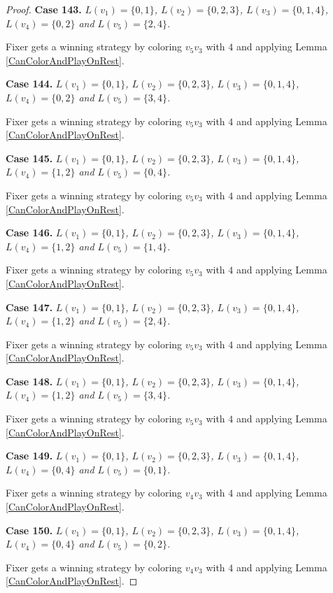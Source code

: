 \documentclass[12pt]{amsart}
\theoremstyle{plain}
\theoremstyle{definition}
\theoremstyle{remark}
\begin{document}
\begin{proof}
\noindent\textbf{Case 143.  }\textit{$L(v_1) = \{0, 1\}$, $L(v_2) = \{0, 2, 3\}$, $L(v_3) = \{0, 1, 4\}$, $L(v_4) = \{0, 2\}$ and $L(v_5) = \{2, 4\}$.}

Fixer gets a winning strategy by coloring $v_5v_3$ with $4$ and applying Lemma \ref{CanColorAndPlayOnRest}.

\noindent\textbf{Case 144.  }\textit{$L(v_1) = \{0, 1\}$, $L(v_2) = \{0, 2, 3\}$, $L(v_3) = \{0, 1, 4\}$, $L(v_4) = \{0, 2\}$ and $L(v_5) = \{3, 4\}$.}

Fixer gets a winning strategy by coloring $v_5v_3$ with $4$ and applying Lemma \ref{CanColorAndPlayOnRest}.

\noindent\textbf{Case 145.  }\textit{$L(v_1) = \{0, 1\}$, $L(v_2) = \{0, 2, 3\}$, $L(v_3) = \{0, 1, 4\}$, $L(v_4) = \{1, 2\}$ and $L(v_5) = \{0, 4\}$.}

Fixer gets a winning strategy by coloring $v_5v_3$ with $4$ and applying Lemma \ref{CanColorAndPlayOnRest}.

\noindent\textbf{Case 146.  }\textit{$L(v_1) = \{0, 1\}$, $L(v_2) = \{0, 2, 3\}$, $L(v_3) = \{0, 1, 4\}$, $L(v_4) = \{1, 2\}$ and $L(v_5) = \{1, 4\}$.}

Fixer gets a winning strategy by coloring $v_5v_3$ with $4$ and applying Lemma \ref{CanColorAndPlayOnRest}.

\noindent\textbf{Case 147.  }\textit{$L(v_1) = \{0, 1\}$, $L(v_2) = \{0, 2, 3\}$, $L(v_3) = \{0, 1, 4\}$, $L(v_4) = \{1, 2\}$ and $L(v_5) = \{2, 4\}$.}

Fixer gets a winning strategy by coloring $v_5v_3$ with $4$ and applying Lemma \ref{CanColorAndPlayOnRest}.

\noindent\textbf{Case 148.  }\textit{$L(v_1) = \{0, 1\}$, $L(v_2) = \{0, 2, 3\}$, $L(v_3) = \{0, 1, 4\}$, $L(v_4) = \{1, 2\}$ and $L(v_5) = \{3, 4\}$.}

Fixer gets a winning strategy by coloring $v_5v_3$ with $4$ and applying Lemma \ref{CanColorAndPlayOnRest}.

\noindent\textbf{Case 149.  }\textit{$L(v_1) = \{0, 1\}$, $L(v_2) = \{0, 2, 3\}$, $L(v_3) = \{0, 1, 4\}$, $L(v_4) = \{0, 4\}$ and $L(v_5) = \{0, 1\}$.}

Fixer gets a winning strategy by coloring $v_4v_3$ with $4$ and applying Lemma \ref{CanColorAndPlayOnRest}.

\noindent\textbf{Case 150.  }\textit{$L(v_1) = \{0, 1\}$, $L(v_2) = \{0, 2, 3\}$, $L(v_3) = \{0, 1, 4\}$, $L(v_4) = \{0, 4\}$ and $L(v_5) = \{0, 2\}$.}

Fixer gets a winning strategy by coloring $v_4v_3$ with $4$ and applying Lemma \ref{CanColorAndPlayOnRest}.


\end{proof}
\end{document}
